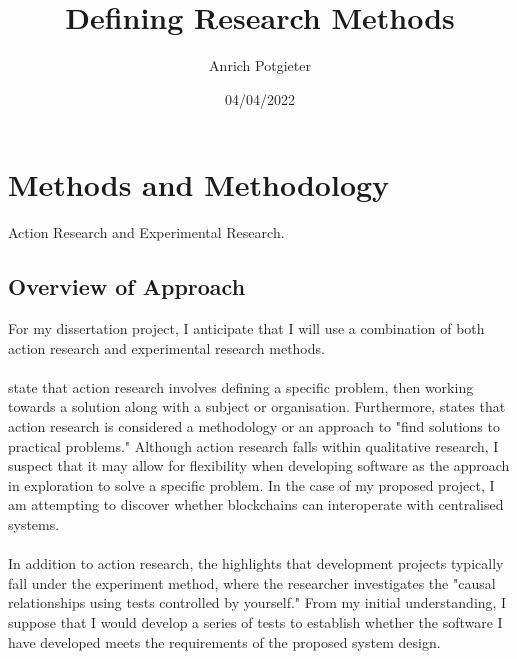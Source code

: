 \documentclass[12pt]{article}
\title{Defining Research Methods}
\author{Anrich Potgieter}
\date{04/04/2022}
\begin{document}
\maketitle
\tableofcontents

\section{Methods and Methodology}

Action Research and Experimental Research.

\subsection{Overview of Approach}

For my dissertation project, I anticipate that I will use a combination of both action research and experimental research methods.
\\\\
\autocite{dawsonChapterResearchMethods2015} state that action research involves defining a specific problem, then working towards a solution along with a subject or organisation.
Furthermore, \autocite{blairChapterChoosingMethodology2016} states that action research is considered a methodology or an approach to "find solutions to practical problems." 
Although action research falls within qualitative research, I suspect that it may allow for flexibility when developing software as the approach in exploration to solve a specific problem. In the case of my proposed project, I am attempting to discover whether blockchains can interoperate with centralised systems.
\\\\
In addition to action research, the \autocite{dawsonChapterResearchMethods2015} highlights that development projects typically fall under the experiment method, where the researcher investigates the "causal relationships using tests controlled by yourself."
From my initial understanding, I suppose that I would develop a series of tests to establish whether the software I have developed meets the requirements of the proposed system design.

\printbibliography
\end{document}

